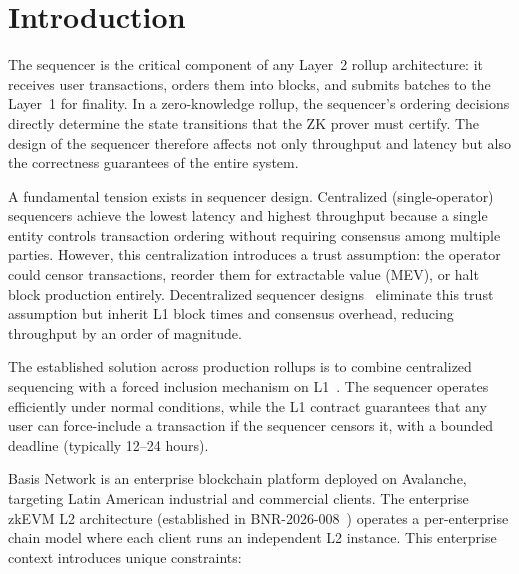 
\section{Introduction}

The sequencer is the critical component of any Layer~2 rollup architecture: it receives
user transactions, orders them into blocks, and submits batches to the Layer~1 for
finality. In a zero-knowledge rollup, the sequencer's ordering decisions directly
determine the state transitions that the ZK prover must certify. The design of the
sequencer therefore affects not only throughput and latency but also the correctness
guarantees of the entire system.

A fundamental tension exists in sequencer design. Centralized (single-operator) sequencers
achieve the lowest latency and highest throughput because a single entity controls
transaction ordering without requiring consensus among multiple parties. However, this
centralization introduces a trust assumption: the operator could censor transactions,
reorder them for extractable value (MEV), or halt block production entirely. Decentralized
sequencer designs~\cite{taiko2024based} eliminate this trust assumption but inherit L1
block times and consensus overhead, reducing throughput by an order of magnitude.

The established solution across production rollups is to combine centralized sequencing
with a forced inclusion mechanism on L1~\cite{arbitrum2024architecture,
optimism2024derivation}. The sequencer operates efficiently under normal conditions,
while the L1 contract guarantees that any user can force-include a transaction if the
sequencer censors it, with a bounded deadline (typically 12--24 hours).

Basis Network is an enterprise blockchain platform deployed on Avalanche, targeting Latin
American industrial and commercial clients. The enterprise zkEVM L2 architecture
(established in BNR-2026-008~\cite{bnr2026008evm}) operates a per-enterprise chain model
where each client runs an independent L2 instance. This enterprise context introduces
unique constraints:

